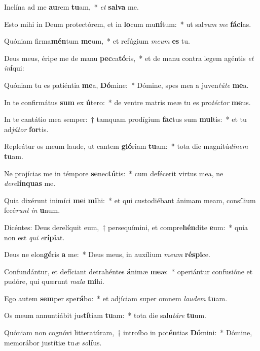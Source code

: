 \item Inclína ad me \textbf{au}rem \textbf{tu}am,~* \textit{et} \textbf{sal}\textbf{va} me.
\item Esto mihi in Deum protectórem, et in \textbf{lo}cum mu\textbf{ní}tum:~* ut sal\textit{vum} \textit{me} \textbf{fá}\textbf{ci}as.
\item Quóniam firma\textbf{mén}tum \textbf{me}um,~* et refúgium \textit{me}\textit{um} \textbf{es} tu.
\item Deus meus, éripe me de manu \textbf{pec}ca\textbf{tó}ris,~* et de manu contra legem agéntis \textit{et} \textit{in}\textbf{í}qui:
\item Quóniam tu es patiéntia \textbf{me}a, \textbf{Dó}mine:~* Dómine, spes mea a juven\textit{tú}\textit{te} \textbf{me}a.
\item In te confirmátus \textbf{sum} ex \textbf{ú}tero:~* de ventre matris meæ tu es pro\textit{téc}\textit{tor} \textbf{me}us.
\item In te cantátio mea semper:~† tamquam prodígium \textbf{fac}tus sum \textbf{mul}tis:~* et tu ad\textit{jú}\textit{tor} \textbf{for}tis.
\item Repleátur os meum laude, ut cantem \textbf{gló}riam \textbf{tu}am:~* tota die magnitú\textit{di}\textit{nem} \textbf{tu}am.
\item Ne projícias me in témpore \textbf{se}nec\textbf{tú}tis:~* cum defécerit virtus mea, ne \textit{de}\textit{re}\textbf{lín}\textbf{quas} me.
\item Quia dixérunt inimíci \textbf{me}i \textbf{mi}hi:~* et qui custodiébant ánimam meam, consílium fecé\textit{runt} \textit{in} \textbf{u}num.
\item Dicéntes: Deus derelíquit eum,~† persequímini, et compre\textbf{hén}dite \textbf{e}um:~* quia non est \textit{qui} \textit{e}\textbf{rí}\textbf{pi}at.
\item Deus ne elon\textbf{gé}ris \textbf{a} me:~* Deus meus, in auxílium \textit{me}\textit{um} \textbf{ré}\textbf{spi}ce.
\item Confundántur, et defíciant detrahéntes \textbf{á}nimæ \textbf{me}æ:~* operiántur confusióne et pudóre, qui quærunt \textit{ma}\textit{la} \textbf{mi}hi.
\item Ego autem \textbf{sem}per spe\textbf{rá}bo:~* et adjíciam super omnem \textit{lau}\textit{dem} \textbf{tu}am.
\item Os meum annuntiábit jus\textbf{tí}tiam \textbf{tu}am:~* tota die salu\textit{tá}\textit{re} \textbf{tu}um.
\item Quóniam non cognóvi litteratúram,~† introíbo in pot\textbf{én}tias \textbf{Dó}mini:~* Dómine, memorábor justítiæ tu\textit{æ} \textit{so}\textbf{lí}us.
